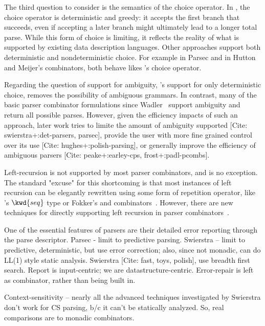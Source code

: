 The third question to consider is the semantics of the choice operator. In \ddc{}, the choice operator is deterministic and greedy: it accepts the first branch that succeeds, even if accepting a later branch might ultimately lead to a longer total parse. While this form of choice is limiting, it reflects the reality of what is supported by existing data description languages. Other approaches support both deterministic and nondeterministic choice. For example  in Parsec and  in Hutton and Meijer's combinators\cite{hutton+:monadic-parsing}, both behave likes \ddc{}'s choice operator.

Regarding the question of support for ambiguity, \ddc{}'s support for only deterministic choice, removes the possibility of ambiguous grammars. In contrast, many of the basic parser combinator formulations since Wadler~\cite{wadler:successes} support ambiguity and return all possible parses. However, given the efficiency impacts of such an approach, later work tries to limite the amount of ambiguity supported [Cite: swierstra+:det-parsers, parsec], provide the user with more fine grained control over its use [Cite: hughes+:polish-parsing], or generally improve the efficiency of ambiguous parsers [Cite: peake+:earley-cps, frost+:padl-pcombs].

Left-recursion is not supported by most parser combinators, and \ddc{} is no exception. The standard "excuse" for this shortcoming is that most instances of left recursion can be elegantly rewritten using some form of repetition operator, like \ddc{}'s $\kwd{seq}$ type or
Fokker's  and  combinators~\cite{fokker:functional-parsers}. However, there are new techniques for directly supporting left recursion in parser combinators~\cite{frost+:padl-pcombs}.

One of the essential features of \ddc{} parsers are their detailed error reporting through the parse descriptor. Parsec - limit to predictive parsing. Swierstra -- limit to predictive, deterministic, but use error correction; also, since not monadic, can do LL(1) style static analysis. Swierstra [Cite: fast, toys, polish], use breadth first search. Report is input-centric; we are datastructure-centric. Error-repair is left as combinator, rather than being built in.

Context-sensitivity -- nearly all the advanced techniques investigated by Swierstra don't work for CS parsing, b/c it can't be statically analyzed. So, real comparisons are to monadic combinators.

